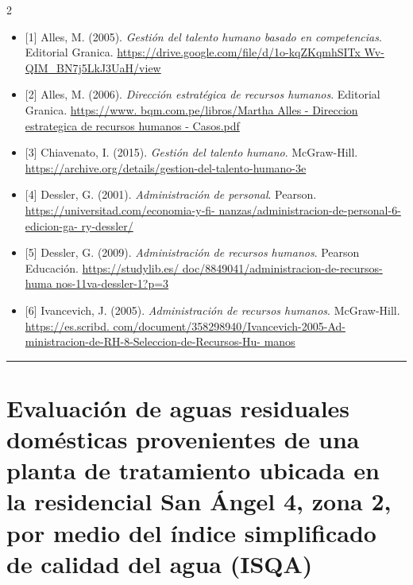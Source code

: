\documentclass[12pt,spanish,Letterpaper,openany]{book}
\newcommand{\HRule}{\begin{center}\rule{0.5\linewidth}{0.2mm}\end{center}}
\begin{document}
\begin {multicols}{2}
\begin{itemize}
\item
  {[}1{]} Alles, M. (2005). \emph{Gestión del talento humano basado en competencias}. Editorial Granica. \href{https://drive.google.com/file/d/1o-kqZKqmhSITxWv-QIM_BN7j5LkJ3UaH/view}{https://drive.google.com/file/d/1o-kqZKqmhSITx
  Wv-QIM\_BN7j5LkJ3UaH/view}
\item
  {[}2{]} Alles, M. (2006). \emph{Dirección estratégica de recursos humanos}. Editorial Granica. \href{https://www.bqm.com.pe/libros/Martha\%20Alles\%20-\%20Direccion\%20estrategica\%20de\%20recursos\%20humanos\%20-\%20Casos.pdf}{https://www.
  bqm.com.pe/libros/Martha Alles - Direccion estrategica de recursos humanos - Casos.pdf}
\item
  {[}3{]} Chiavenato, I. (2015). \emph{Gestión del talento humano}. McGraw-Hill. \url{https://archive.org/details/gestion-del-talento-humano-3e}
\item
  {[}4{]} Dessler, G. (2001). \emph{Administración de personal}. Pearson. \href{https://universitad.com/economia-y-finanzas/administracion-de-personal-6-edicion-gary-dessler/}{https://universitad.com/economia-y-fi-
  nanzas/administracion-de-personal-6-edicion-ga-
  ry-dessler/}
\item
  {[}5{]} Dessler, G. (2009). \emph{Administración de recursos humanos}. Pearson Educación. \href{https://studylib.es/doc/8849041/administracion-de-recursos-humanos-11va-dessler-1?p=3}{https://studylib.es/
  doc/8849041/administracion-de-recursos-huma
  nos-11va-dessler-1?p=3}
\item
  {[}6{]} Ivancevich, J. (2005). \emph{Administración de recursos humanos}. McGraw-Hill. \href{https://es.scribd.com/document/358298940/Ivancevich-2005-Administracion-de-RH-8-Seleccion-de-Recursos-Humanos}{https://es.scribd.
  com/document/358298940/Ivancevich-2005-Ad-
  ministracion-de-RH-8-Seleccion-de-Recursos-Hu-
  manos}
\end{itemize}

\end {multicols}

\medskip

\HRule

\medskip

\hypertarget{art06}{%
\chapter{Evaluación de aguas residuales domésticas provenientes de una planta de tratamiento ubicada en la residencial San Ángel 4, zona 2, por medio del índice simplificado de calidad del agua (ISQA)}\label{art06}}
\end{document}
